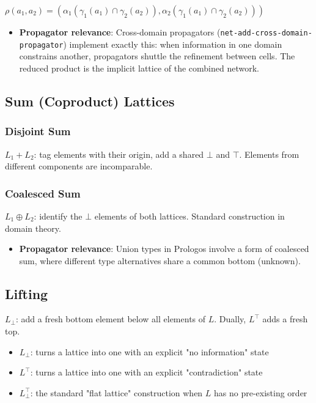 \documentclass[11pt]{article}
\begin{document}
\(\rho(a_1, a_2) = (\alpha_1(\gamma_1(a_1) \cap \gamma_2(a_2)), \alpha_2(\gamma_1(a_1) \cap \gamma_2(a_2)))\)

\begin{itemize}
\item \textbf{Propagator relevance}: Cross-domain propagators (\texttt{net-add-cross-domain-propagator})
implement exactly this: when information in one domain constrains another,
propagators shuttle the refinement between cells. The reduced product is the
implicit lattice of the combined network.
\end{itemize}
\subsection{Sum (Coproduct) Lattices}
\label{sec:org9f87732}

\subsubsection{Disjoint Sum}
\label{sec:orge631c8a}

\(L_1 + L_2\): tag elements with their origin, add a shared \(\bot\) and \(\top\).
Elements from different components are incomparable.
\subsubsection{Coalesced Sum}
\label{sec:org41e402b}

\(L_1 \oplus L_2\): identify the \(\bot\) elements of both lattices. Standard
construction in domain theory.

\begin{itemize}
\item \textbf{Propagator relevance}: Union types in Prologos involve a form of coalesced
sum, where different type alternatives share a common bottom (unknown).
\end{itemize}
\subsection{Lifting}
\label{sec:org854a8a3}

\(L_\bot\): add a fresh bottom element below all elements of \(L\). Dually,
\(L^\top\) adds a fresh top.

\begin{itemize}
\item \(L_\bot\): turns a lattice into one with an explicit "no information" state
\item \(L^\top\): turns a lattice into one with an explicit "contradiction" state
\item \(L_\bot^\top\): the standard "flat lattice" construction when \(L\) has no
pre-existing order
\end{itemize}
\end{document}
